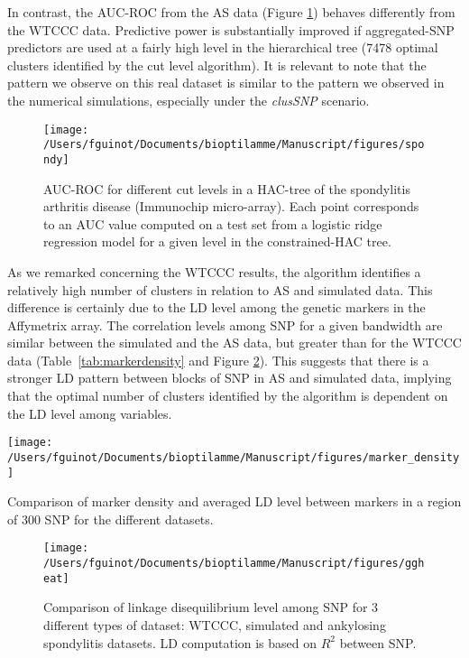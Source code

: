 \documentclass[]{book}
\begin{document}
In contrast, the AUC-ROC from the AS data (Figure \ref{fig:spondy})
behaves differently from the WTCCC data. Predictive power is
substantially improved if aggregated-SNP predictors are used at a fairly
high level in the hierarchical tree (7478 optimal clusters identified by
the cut level algorithm). It is relevant to note that the pattern we
observe on this real dataset is similar to the pattern we observed in
the numerical simulations, especially under the \emph{clusSNP} scenario.



\begin{figure}

{\centering \texttt{[image: /Users/fguinot/Documents/bioptilamme/Manuscript/figures/spondy]} 

}

\caption{AUC-ROC for different cut levels in a HAC-tree of the spondylitis arthritis disease (Immunochip micro-array). Each point corresponds to an AUC value computed on a test set from a logistic ridge regression model for a given level in the constrained-HAC tree.}\label{fig:spondy}
\end{figure}

As we remarked concerning the WTCCC results, the algorithm identifies a
relatively high number of clusters in relation to AS and simulated data.
This difference is certainly due to the LD level among the genetic
markers in the Affymetrix array. The correlation levels among SNP for a
given bandwidth are similar between the simulated and the AS data, but
greater than for the WTCCC data (Table~\ref{tab:markerdensity} and
Figure \ref{fig:ggheat}). This suggests that there is a stronger LD
pattern between blocks of SNP in AS and simulated data, implying that
the optimal number of clusters identified by the algorithm is dependent
on the LD level among variables.

\begin{center}\texttt{[image: /Users/fguinot/Documents/bioptilamme/Manuscript/figures/marker\_density]} \end{center}

\label{tab:markerdensity}Comparison of marker density and averaged LD level between markers in a region of 300 SNP for the different datasets.



\begin{figure}

{\centering \texttt{[image: /Users/fguinot/Documents/bioptilamme/Manuscript/figures/ggheat]} 

}

\caption{Comparison of linkage disequilibrium level among SNP for 3 different types of dataset: WTCCC, simulated and ankylosing spondylitis datasets. LD computation is based on \(R^2\) between SNP.}\label{fig:ggheat}
\end{figure}
\end{document}
